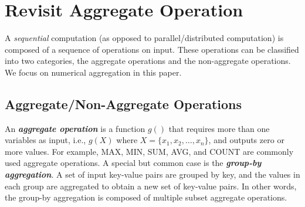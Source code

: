 \section{Revisit Aggregate Operation}
\label{sec:aggre}

A \emph{sequential} computation (as opposed to parallel/distributed computation) is composed of a sequence of operations on input. These operations can be classified into two categories, the aggregate operations and the non-aggregate operations. We focus on numerical aggregation in this paper. 

\subsection{Aggregate/Non-Aggregate Operations}


An \emph{\textbf{aggregate operation}} is a function $g()$ that requires more than one variables as input, i.e., $g(X)$ where $X=\{x_1, x_2, \ldots, x_n\}$, and outputs zero or more values. For example, MAX, MIN, SUM, AVG, and COUNT are commonly used aggregate operations. A special but common case is the \emph{\textbf{group-by aggregation}}. A set of input key-value pairs are grouped by key, and the values in each group are aggregated to obtain a new set of key-value pairs. In other words, the group-by aggregation is composed of multiple subset aggregate operations.

\begin{comment}
\begin{equation}\label{eq:groupbyagg}
\begin{aligned}
  &g_k\big(\langle k_1,x_{1,1}\rangle,\langle k_2,x_{2,1}\rangle,\langle k_1,x_{1,2}\rangle,\ldots,\langle k_n,x_{n,m}\rangle\big)\\
  \rightarrow&\big\{\langle k_1,g(x_{1,1},x_{1,2},\ldots)\rangle,\ldots,\langle k_n,g(x_{n,1},x_{n,2},\ldots)\rangle\big\}\\
  \rightarrow&\big\{\langle k_1,y_{1}\rangle,\langle k_2,y_{2}\rangle,\ldots,\langle k_n,y_{n}\rangle\big\}.
\end{aligned}
\end{equation}
\end{comment}

